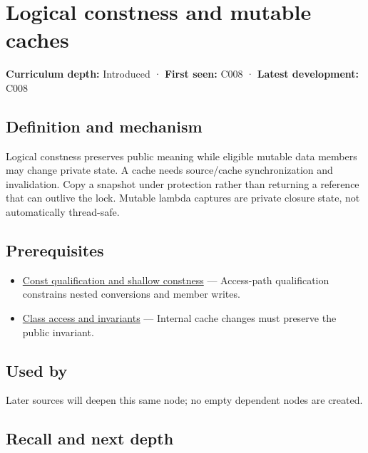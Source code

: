 \hypertarget{appendix-f5593256bcaf}{}\label{referencestart:appendix-f5593256bcaf}
\section{Logical constness and mutable caches}\label{appendix-f5593256bcaf-logical-constness-and-mutable-caches}

\textbf{Curriculum depth:} Introduced · \textbf{First seen:} C008 · \textbf{Latest development:} C008

\subsection{Definition and mechanism}\label{appendix-f5593256bcaf-definition-and-mechanism}

Logical constness preserves public meaning while eligible mutable data members may change private state. A cache needs source/cache synchronization and invalidation. Copy a snapshot under protection rather than returning a reference that can outlive the lock. Mutable lambda captures are private closure state, not automatically thread-safe.

\subsection{Prerequisites}\label{appendix-f5593256bcaf-prerequisites}

\begin{itemize}
\tightlist
\item
  \hyperref[appendix-c25d60fed375]{Const qualification and shallow constness} --- Access-path qualification constrains nested conversions and member writes.
\item
  \hyperref[appendix-8e5214819615]{Class access and invariants} --- Internal cache changes must preserve the public invariant.
\end{itemize}

\subsection{Used by}\label{appendix-f5593256bcaf-used-by}

Later sources will deepen this same node; no empty dependent nodes are created.

\subsection{Recall and next depth}\label{appendix-f5593256bcaf-recall-and-next-depth}

